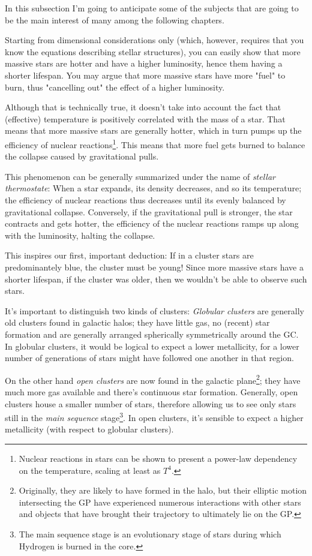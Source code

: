 In this subsection I'm going to anticipate some of the subjects that are going to be the main interest of many among the following chapters.
\par Starting from dimensional considerations only (which, however, requires that you know the equations describing stellar structures), you can easily show that more massive stars are hotter and have a higher luminosity, hence them having a shorter lifespan. You may argue that more massive stars have more "fuel" to burn, thus "cancelling out" the effect of a higher luminosity.
\par Although that is technically true, it doesn't take into account the fact that (effective) temperature is positively correlated with the mass of a star. That means that more massive stars are generally hotter, which in turn pumps up the efficiency of nuclear reactions\footnote{Nuclear reactions in stars can be shown to present a power-law dependency on the temperature, scaling at least as $T^{4}$.}. This means that more fuel gets burned to balance the collapse caused by gravitational pulls.
\par This phenomenon can be generally summarized under the name of \emph{stellar thermostate}: When a star expands, its density decreases, and so its temperature; the efficiency of nuclear reactions thus decreases until its evenly balanced by gravitational collapse. Conversely, if the gravitational pull is stronger, the star contracts and gets hotter, the efficiency of the nuclear reactions ramps up along with the luminosity, halting the collapse.
\par This inspires our first, important deduction: If in a cluster stars are predominantely blue, the cluster must be young! Since more massive stars have a shorter lifespan, if the cluster was older, then we wouldn't be able to observe such stars.
\par It's important to distinguish two kinds of clusters: \emph{Globular clusters} are generally old clusters found in galactic halos; they have little gas, no (recent) star formation and are generally arranged spherically symmetrically around the GC. In globular clusters, it would be logical to expect a lower metallicity, for a lower number of generations of stars might have followed one another in that region.
\par On the other hand \emph{open clusters} are now found in the galactic plane\footnote{Originally, they are likely to have formed in the halo, but their elliptic motion intersecting the GP have experienced numerous interactions with other stars and objects that have brought their trajectory to ultimately lie on the GP.}; they have much more gas available and there's continuous star formation. Generally, open clusters house a smaller number of stars, therefore allowing us to see only stars still in the \emph{main sequence} stage\footnote{The main sequence stage is an evolutionary stage of stars during which Hydrogen is burned in the core.}. In open clusters, it's sensible to expect a higher metallicity (with respect to globular clusters).
